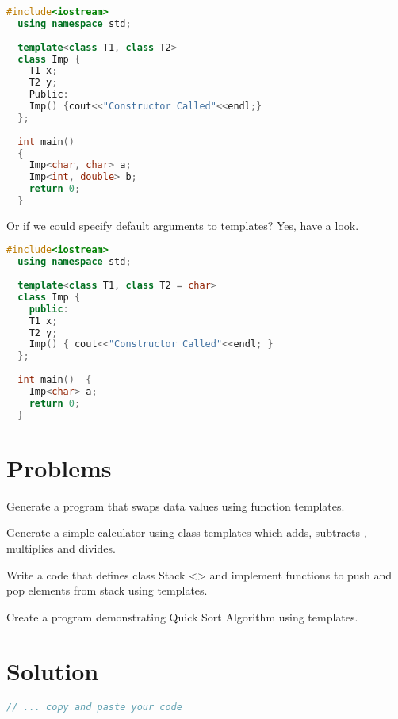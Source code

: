 \documentclass[11pt,fleqn]{book} %
\begin{document}
\begin{lstlisting}[language=C++, caption= Important Fact 1]
  #include<iostream>
  using namespace std;
  
  template<class T1, class T2>
  class Imp {
    T1 x;
    T2 y;
    Public:
    Imp() {cout<<"Constructor Called"<<endl;}
  };
  
  int main()  
  {
    Imp<char, char> a;
    Imp<int, double> b;
    return 0;
  }
\end{lstlisting}

Or if we could specify default arguments to templates? Yes, have a look.
\begin{lstlisting}[language=C++, caption= Important Fact 2]
  #include<iostream>
  using namespace std;
  
  template<class T1, class T2 = char>
  class Imp {
    public:
    T1 x;
    T2 y;
    Imp() { cout<<"Constructor Called"<<endl; }
  };
  
  int main()  {
    Imp<char> a; 
    return 0;
  }
\end{lstlisting}

\section{Problems}

\begin{problem} Generate a program that swaps data values using function templates.\\
\end{problem}
\begin{problem} Generate a simple calculator using class templates which adds, subtracts , multiplies and divides.\\
\end{problem}
\begin{problem} Write a code that defines class Stack <> and implement functions to push and pop elements from stack using templates.\\
\end{problem}
\begin{problem} Create a program demonstrating Quick Sort Algorithm using templates.
\end{problem}

\newpage
\section{Solution}
\begin{lstlisting}[language=C++]
  // ... copy and paste your code
\end{lstlisting}
\end{document}
